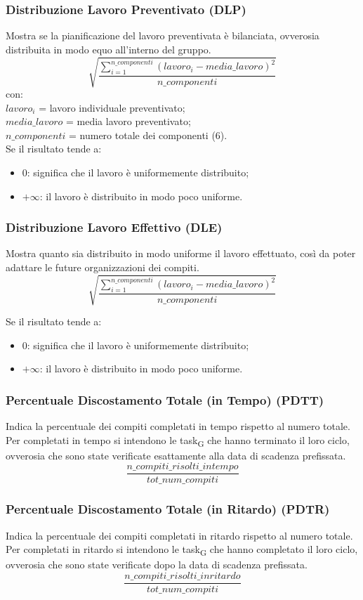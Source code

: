 \subsubsection{Distribuzione Lavoro Preventivato (DLP)}
Mostra se la pianificazione del lavoro preventivata è bilanciata, ovverosia distribuita in modo equo all'interno del gruppo.
\[\sqrt{\frac{\sum_{i=1}^{n\_componenti}(lavoro_i-media\_lavoro)^2}{n\_componenti}}\]
con:\\
$lavoro_i$ = lavoro individuale preventivato;\\
$media\_lavoro$ = media lavoro preventivato;\\
$n\_componenti$ = numero totale dei componenti (6).
\\Se il risultato tende a:
\begin{itemize}
	\item 0: significa che il lavoro è uniformemente distribuito;
	\item $+\infty$: il lavoro è distribuito in modo poco uniforme.
\end{itemize}
\subsubsection{Distribuzione Lavoro Effettivo (DLE)}
Mostra quanto sia distribuito in modo uniforme il lavoro effettuato, così da poter adattare le future organizzazioni dei compiti.
\[\sqrt{\frac{\sum_{i=1}^{n\_componenti}(lavoro_i-media\_lavoro)^2}{n\_componenti}}\]

Se il risultato tende a:
\begin{itemize}
	\item 0: significa che il lavoro è uniformemente distribuito;
	\item $+\infty$: il lavoro è distribuito in modo poco uniforme.
\end{itemize}

\subsubsection{Percentuale Discostamento Totale (in Tempo) (PDTT)}
Indica la percentuale dei compiti completati in tempo rispetto al numero totale. Per completati in tempo si intendono le task\textsubscript{G} che hanno terminato il loro ciclo, ovverosia che sono state verificate esattamente alla data di scadenza prefissata.
\[\frac{n\_compiti\_risolti\_intempo}{tot\_num\_compiti}\]
\subsubsection{Percentuale Discostamento Totale (in Ritardo) (PDTR)}
Indica la percentuale dei compiti completati in ritardo rispetto al numero totale. Per completati in ritardo si intendono le task\textsubscript{G} che hanno completato il loro ciclo, ovverosia che sono state verificate dopo la data di scadenza prefissata.
\[\frac{n\_compiti\_risolti\_inritardo}{tot\_num\_compiti}\]
